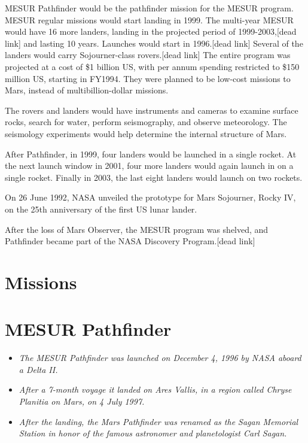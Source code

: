 MESUR Pathfinder would be the pathfinder mission for the MESUR program.
MESUR regular missions would start landing in 1999. The multi-year MESUR
would have 16 more landers, landing in the projected period of
1999-2003,{[}dead link{]} and lasting 10 years. Launches would start in
1996.{[}dead link{]} Several of the landers would carry Sojourner-class
rovers.{[}dead link{]} The entire program was projected at a cost of \$1
billion US, with per annum spending restricted to \$150 million US,
starting in FY1994. They were planned to be low-cost missions to Mars,
instead of multibillion-dollar missions.

The rovers and landers would have instruments and cameras to examine
surface rocks, search for water, perform seismography, and observe
meteorology. The seismology experiments would help determine the
internal structure of Mars.

After Pathfinder, in 1999, four landers would be launched in a single
rocket. At the next launch window in 2001, four more landers would again
launch in on a single rocket. Finally in 2003, the last eight landers
would launch on two rockets.

On 26 June 1992, NASA unveiled the prototype for Mars Sojourner, Rocky
IV, on the 25th anniversary of the first US lunar lander.

After the loss of Mars Observer, the MESUR program was shelved, and
Pathfinder became part of the NASA Discovery Program.{[}dead link{]}

\section{Missions}\label{missions}

\section{MESUR Pathfinder}\label{mesur-pathfinder}

\begin{itemize}
\item
  \emph{The MESUR Pathfinder was launched on December 4, 1996 by NASA
  aboard a Delta II.}
\item
  \emph{After a 7-month voyage it landed on Ares Vallis, in a region
  called Chryse Planitia on Mars, on 4 July 1997.}
\item
  \emph{After the landing, the Mars Pathfinder was renamed as the Sagan
  Memorial Station in honor of the famous astronomer and planetologist
  Carl Sagan.}
\end{itemize}

